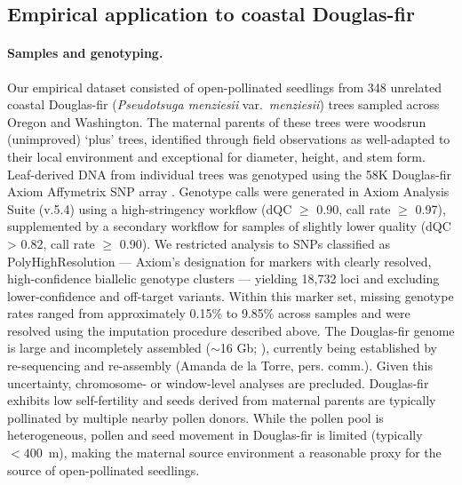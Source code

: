 \documentclass[]{article}
\newcommand{\dfir}{Douglas-fir\xspace}
\begin{document}
\subsection{Empirical application to coastal \dfir}

\paragraph{Samples and genotyping.}
Our empirical dataset consisted of open-pollinated seedlings from
348 unrelated coastal \dfir
(\textit{Pseudotsuga menziesii} var.\ \textit{menziesii}) trees
sampled across Oregon and Washington.
The maternal parents of these trees were woodsrun (unimproved) `plus' trees,
identified through field observations as well-adapted to their local environment and exceptional
for diameter, height, and stem form. Leaf-derived DNA from individual trees was genotyped using the 58K \dfir
Axiom Affymetrix SNP array \citep{howe_axiom_2020}.
Genotype calls were generated in Axiom Analysis Suite (v.5.4)
using a high-stringency workflow (dQC $\geq$ 0.90, call rate $\geq$ 0.97),
supplemented by a secondary workflow for samples of slightly lower quality
(dQC > 0.82, call rate $\geq$ 0.90).
We restricted analysis to SNPs classified as PolyHighResolution ---
Axiom's designation for markers with clearly resolved,
high-confidence biallelic genotype clusters --- yielding 18,732
loci and excluding lower-confidence and off-target variants.
Within this marker set, missing genotype rates ranged from approximately 
0.15\% to 9.85\% across samples and were resolved using the 
imputation procedure described above.
The \dfir genome is large and incompletely
assembled ($\sim$16 Gb; \citealp{neale_douglas-fir_2017}),
currently being established by re-sequencing and re-assembly (Amanda de la Torre, pers. comm.). 
Given this uncertainty, chromosome- or window-level analyses are precluded.
\dfir exhibits low self-fertility and
seeds derived from maternal parents are typically pollinated by multiple nearby
pollen donors. While the pollen pool is heterogeneous, pollen and seed movement
in \dfir is limited (typically $<400$~m),
making the maternal source environment a reasonable proxy for the source of open-pollinated
seedlings.
\end{document}
